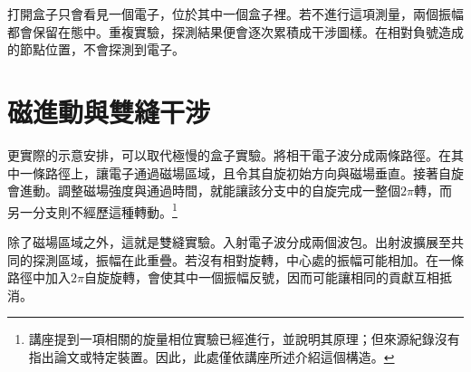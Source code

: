 打開盒子只會看見一個電子，位於其中一個盒子裡。若不進行這項測量，兩個振幅都會保留在態中。重複實驗，探測結果便會逐次累積成干涉圖樣。在相對負號造成的節點位置，不會探測到電子。

\section{磁進動與雙縫干涉}

更實際的示意安排，可以取代極慢的盒子實驗。將相干電子波分成兩條路徑。在其中一條路徑上，讓電子通過磁場區域，且令其自旋初始方向與磁場垂直。接著自旋會進動。調整磁場強度與通過時間，就能讓該分支中的自旋完成一整個\(2\pi\)轉，而另一分支則不經歷這種轉動。\footnote{講座提到一項相關的旋量相位實驗已經進行，並說明其原理；但來源紀錄沒有指出論文或特定裝置。因此，此處僅依講座所述介紹這個構造。}

\begin{classroomqa}
\end{classroomqa}

\begin{classroomqa}
\end{classroomqa}

除了磁場區域之外，這就是雙縫實驗。入射電子波分成兩個波包。出射波擴展至共同的探測區域，振幅在此重疊。若沒有相對旋轉，中心處的振幅可能相加。在一條路徑中加入\(2\pi\)自旋旋轉，會使其中一個振幅反號，因而可能讓相同的貢獻互相抵消。

\begin{classroomqa}
\end{classroomqa}

\begin{classroomqa}
\end{classroomqa}

